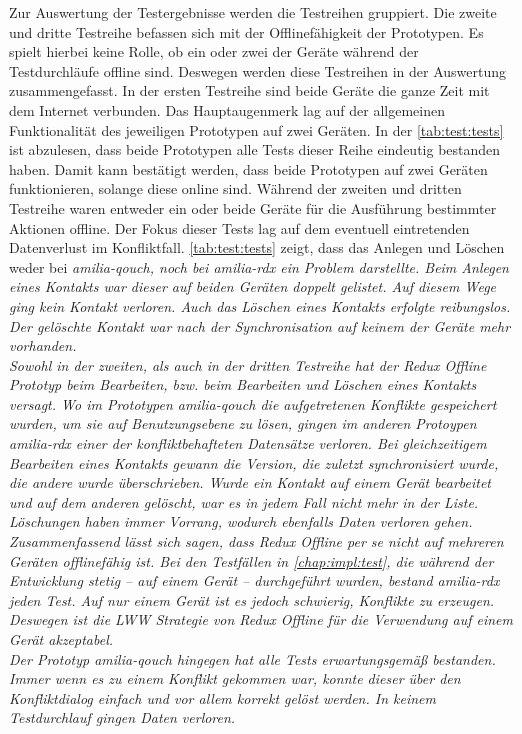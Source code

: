Zur Auswertung der Testergebnisse werden die Testreihen gruppiert.
Die zweite und dritte Testreihe befassen sich mit der Offlinefähigkeit der Prototypen.
Es spielt hierbei keine Rolle, ob ein oder zwei der Geräte während der Testdurchläufe offline sind. Deswegen werden diese Testreihen in der Auswertung zusammengefasst.
%
%
%
In der ersten Testreihe sind beide Geräte die ganze Zeit mit dem Internet verbunden.
Das Hauptaugenmerk lag auf der allgemeinen Funktionalität des jeweiligen Prototypen auf zwei Geräten.
In der \autoref{tab:test:tests} ist abzulesen, dass beide Prototypen alle Tests dieser Reihe eindeutig bestanden haben.
Damit kann bestätigt werden, dass beide Prototypen auf zwei Geräten funktionieren, solange diese online sind.
%
%
%
Während der zweiten und dritten Testreihe waren entweder ein oder beide Geräte für die Ausführung bestimmter Aktionen offline.
Der Fokus dieser Tests lag auf dem eventuell eintretenden Datenverlust im Konfliktfall.
\autoref{tab:test:tests} zeigt, dass das Anlegen und Löschen weder bei \it{amilia-qouch}, noch bei \it{amilia-rdx} ein Problem darstellte.
Beim Anlegen eines Kontakts war dieser auf beiden Geräten doppelt gelistet. Auf diesem Wege ging kein Kontakt verloren.
Auch das Löschen eines Kontakts erfolgte reibungslos. Der gelöschte Kontakt war nach der Synchronisation auf keinem der Geräte mehr vorhanden.\\
Sowohl in der zweiten, als auch in der dritten Testreihe hat der Redux Offline Prototyp beim Bearbeiten, bzw. beim Bearbeiten und Löschen eines Kontakts versagt.
Wo im Prototypen \it{amilia-qouch} die aufgetretenen Konflikte gespeichert wurden, um sie auf Benutzungsebene zu lösen, gingen im anderen Protoypen \it{amilia-rdx} einer der konfliktbehafteten Datensätze verloren.
Bei gleichzeitigem Bearbeiten eines Kontakts gewann die Version, die zuletzt synchronisiert wurde, die andere wurde überschrieben.
Wurde ein Kontakt auf einem Gerät bearbeitet und auf dem anderen gelöscht, war es in jedem Fall nicht mehr in der Liste. Löschungen haben immer Vorrang, wodurch ebenfalls Daten verloren gehen.
% 
%
Zusammenfassend lässt sich sagen, dass Redux Offline per se nicht auf mehreren Geräten offlinefähig ist.
Bei den Testfällen in \autoref{chap:impl:test}, die während der Entwicklung stetig -- auf einem Gerät -- durchgeführt wurden, bestand \it{amilia-rdx} jeden Test.
Auf nur einem Gerät ist es jedoch schwierig, Konflikte zu erzeugen. Deswegen ist die \gls{LWW} Strategie von Redux Offline für die Verwendung auf einem Gerät akzeptabel.\\
Der Prototyp \it{amilia-qouch} hingegen hat alle Tests erwartungsgemäß bestanden.
Immer wenn es zu einem Konflikt gekommen war, konnte dieser über den Konfliktdialog einfach und vor allem korrekt gelöst werden.
In keinem Testdurchlauf gingen Daten verloren.
%